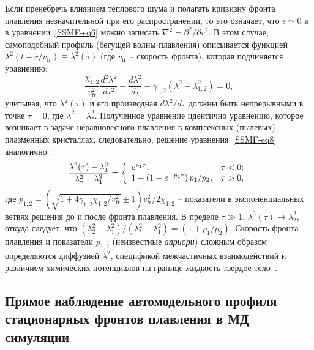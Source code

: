Если пренебречь влиянием теплового шума и полагать кривизну фронта плавления незначительной при его распространении, то это означает, что $ \epsilon \simeq 0 $ и в уравнении~\eqref{SSMF-eq6} можно записать $ \nabla ^ 2 = \partial ^ 2 / \partial r ^ 2 $.
В этом случае, самоподобный профиль (бегущей волны плавления) описывается функцией $\lambda^2(t-r/v_\mathrm{fr})\equiv \lambda^2(\tau)$ (где $v_\mathrm{fr}$ -- скорость фронта), которая подчиняется уравнению:
\begin{equation}
\label{SSMF-eq8}
\frac{\chi_{1,2}}{v_{\mathrm{fr}}^2} \frac{d^2 \lambda^2}{d\tau^2} -\frac{d \lambda^2}{d \tau} -\gamma_{1,2}(\lambda^2-\lambda_{1,2}^2) =0,
\end{equation}
учитывая, что $\lambda^2(\tau) $ и его производная $ d\lambda^2/ d \tau $ должны быть непрерывными в точке $ \tau = 0 $, где $\lambda^2=\lambda_\ast^2$.
Полученное уравнение идентично уравнению, которое возникает в задаче неравновесного плавления в комплексных (пылевых) плазменных кристаллах, следовательно, решение уравнения~\eqref{SSMF-eq8} аналогично \cite{10.1103/physreve.96.043201, 10.1103/physreve.100.023203}:
\begin{equation}
\label{SSMF-eq9}
\frac{\lambda^2(\tau)-\lambda^2_1}{\lambda^2_\ast-\lambda^2_1}=
\left\{
  \begin{array}{ll}
    e^{p_1 \tau}, & \tau < 0;\\
    1+\left(1-e^{-p_2\tau}\right)p_1/p_2 , & \tau > 0,\\
  \end{array}
\right. \\
\end{equation}
где $ p_{1,2} = \left(\sqrt {1 + 4 \gamma_{1,2} \chi_{1,2} / v_\mathrm{fr} ^ 2} \pm 1 \right) v_\mathrm{fr} ^ 2/2 \chi_{1,2} $ -- показатели в экспоненциальных ветвях решения до и после фронта плавления.
В пределе $\tau \gg 1$, $\lambda^2(\tau) \rightarrow \lambda_2^2$, откуда следует, что
$\left(\lambda_2^2-\lambda^2_1\right)/\left(\lambda^2_\ast-\lambda^2_1\right) = (1+p_1/p_2)$.
Скорость фронта плавления и показатели $p_{1,2} $ (неизвестные \emph{априори}) сложным образом определяются диффузией $\lambda^2$, спецификой межчастичных взаимодействий и различием химических потенциалов на границе жидкость-твердое тело~\cite{10.1038/ncomms7942}.


\subsection{Прямое наблюдение автомодельного профиля стационарных фронтов плавления в МД симуляции}
\label{SSMF-Results-MD}

